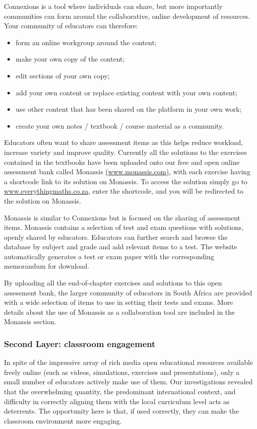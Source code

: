 Connexions is a tool where individuals can share, but more importantly communities can form around the collaborative, online development of resources. Your community of educators can therefore:
\begin{itemize}[noitemsep]
\item form an online workgroup around the content;
\item make your own copy of the content;
\item edit sections of your own copy;
\item add your own content or replace existing content with your own content;
\item use other content that has been shared on the platform in your own work;
\item create your own notes / textbook / course material as a community.
\end{itemize}
Educators often want to share assessment items as this helps reduce workload, increase variety and improve quality. Currently all the solutions to the exercises contained in the textbooks have been uploaded onto our free and open online assessment bank called Monassis \underline{(www.monassis.com)}, with each exercise having a shortcode link to its solution on Monassis. To access the solution simply go to \underline{www.everythingmaths.co.za},  enter the shortcode, and you will be redirected to the solution on Monassis.\par

Monassis is similar to Connexions but is focused on the sharing of assessment items. Monassis contains a selection of test and exam questions with solutions, openly shared by educators. Educators can further search and browse the database by subject and grade and add relevant items to a test. The website automatically generates a test or exam paper with the corresponding memorandum for download.\par

By uploading all the end-of-chapter exercises and solutions to this open assessment bank, the larger community of educators in South Africa are provided with a wide selection of items to use in setting their tests and exams. More details about the use of Monassis as a collaboration tool are included in the Monassis section.\par

\subsubsection{Second Layer: classroom engagement}
In spite of the impressive array of rich media open educational resources available freely online (such as videos, simulations, exercises and presentations), only a small number of educators actively make use of them. Our investigations revealed that the overwhelming quantity, the predominant international context, and difficulty in correctly aligning them with the local curriculum level acts as deterrents. The opportunity here is that, if used correctly, they can make the classroom environment more engaging.\par

